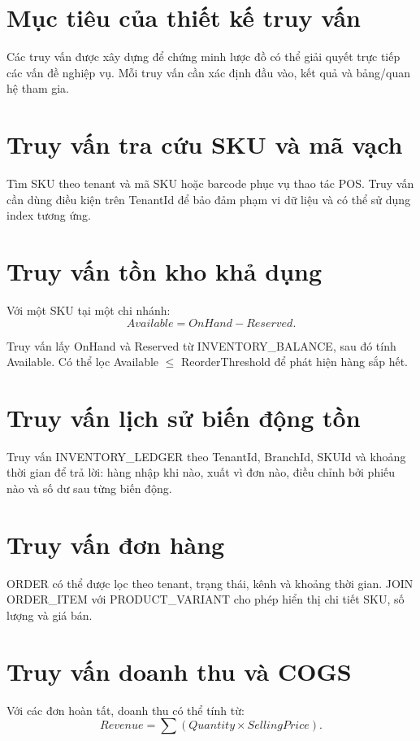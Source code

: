 \section{Mục tiêu của thiết kế truy vấn}

Các truy vấn được xây dựng để chứng minh lược đồ có thể giải quyết trực tiếp các vấn đề nghiệp vụ. Mỗi truy vấn cần xác định đầu vào, kết quả và bảng/quan hệ tham gia.

\section{Truy vấn tra cứu SKU và mã vạch}

Tìm SKU theo tenant và mã SKU hoặc barcode phục vụ thao tác POS. Truy vấn cần dùng điều kiện trên TenantId để bảo đảm phạm vi dữ liệu và có thể sử dụng index tương ứng.

\section{Truy vấn tồn kho khả dụng}

Với một SKU tại một chi nhánh:
\[
Available = OnHand - Reserved.
\]

Truy vấn lấy OnHand và Reserved từ INVENTORY\_BALANCE, sau đó tính Available. Có thể lọc Available $\leq$ ReorderThreshold để phát hiện hàng sắp hết.

\section{Truy vấn lịch sử biến động tồn}

Truy vấn INVENTORY\_LEDGER theo TenantId, BranchId, SKUId và khoảng thời gian để trả lời: hàng nhập khi nào, xuất vì đơn nào, điều chỉnh bởi phiếu nào và số dư sau từng biến động.

\section{Truy vấn đơn hàng}

ORDER có thể được lọc theo tenant, trạng thái, kênh và khoảng thời gian. JOIN ORDER\_ITEM với PRODUCT\_VARIANT cho phép hiển thị chi tiết SKU, số lượng và giá bán.

\section{Truy vấn doanh thu và COGS}

Với các đơn hoàn tất, doanh thu có thể tính từ:
\[
Revenue=\sum(Quantity\times SellingPrice).
\]

